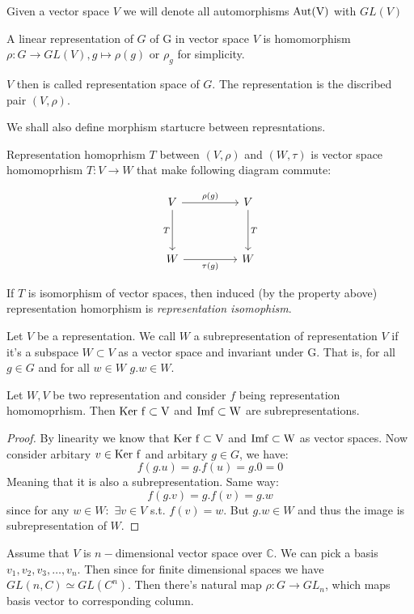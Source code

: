 \documentclass{amsart}
\def\aut{\rm Aut}
\def\ker{\rm Ker\ }
\def\im{\rm Im}
\begin{document}
\begin{definition}
    Given a vector space $V$ we will denote all automorphisms $\aut(V)$ with $GL(V)$
\end{definition}

\begin{definition}
    A linear representation of $G$ of G in vector space $V$ is homomorphism $\rho: G \to GL(V), g \mapsto \rho(g)$ or $\rho_g$ for simplicity.
\end{definition}

$V$ then is called representation space of $G$. The representation is the discribed pair $(V, \rho)$.

We shall also define morphism startucre between represntations.

\begin{definition}
 Representation homoprhism $T$ between $(V, \rho)$ and $(W, \tau)$ is vector space homomoprhism $T: V \to W$ that make following diagram commute:
\end{definition}


\[
    \begin{tikzcd}
	V && V \\
	\\
	W && W
	\arrow["{\rho(g)}", from=1-1, to=1-3]
	\arrow["T", from=1-3, to=3-3]
	\arrow["T"', from=1-1, to=3-1]
	\arrow["{\tau(g)}"', from=3-1, to=3-3]
\end{tikzcd}
\]

If $T$ is isomorphism of vector spaces, then induced (by the property above) representation homorphism is \textit{representation isomophism}.


\begin{definition}
    Let $V$ be a representation. We call $W$ a subrepresentation of representation $V$ if it's a subspace $W \subset V$ as a vector space and invariant under G. That is, for all $g \in G$ and for all $w \in W$ $g.w \in W$.
\end{definition}

\begin{lemma}
    Let $W, V$ be two representation and consider $f$ being representation homomoprhism.
    Then $\ker f \subset V$ and 
    $\im f \subset W$ are subrepresentations.
\end{lemma}

\begin{proof}
    By linearity we know that $\ker f \subset V$ and $\im f \subset W$ as vector spaces. Now consider arbitary $v \in \ker f$ and arbitary $g \in G$, we have:
    $$ f(g.u) = g . f(u) = g . 0 = 0$$
    Meaning that it is also a subrepresentation. Same way:
    $$ f(g.v) = g. f(v) = g.w$$
    since for any $w \in W:$ $\exists v \in V$ s.t. $f(v)=w$. But $g.w \in W$ and thus the image is subrepresentation of $W$.
\end{proof}
Assume that $V$ is $n-$dimensional vector space over $\mathbb{C}$. We can pick a basis $v_1, v_2, v_3,\dots, v_n$. Then since for finite dimensional spaces we have $GL(n, C) \simeq GL(C^n)$. Then there's natural map $\rho: G\to GL_n$, which maps basis vector to corresponding column.
\end{document}
